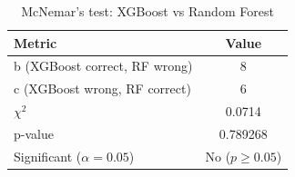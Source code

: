 \begin{table}[h]
\centering
\caption{McNemar's test: XGBoost vs Random Forest}
\label{tab:mcnemar}
\begin{tabular}{lc}
\hline
\textbf{Metric} & \textbf{Value} \\
\hline
b (XGBoost correct, RF wrong) & 8 \\
c (XGBoost wrong, RF correct) & 6 \\
$\chi^2$ & 0.0714 \\
p-value & 0.789268 \\
Significant ($\alpha=0.05$) & No ($p\geq0.05$) \\
\hline
\end{tabular}
\end{table}